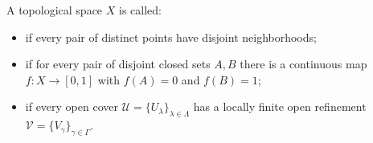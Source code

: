 A topological space $X$ is called:
\begin{itemize}
\item {} if every pair of distinct points have disjoint neighborhoods;
\item {} if for every pair of disjoint closed sets $A, B$ there is a continuous map $f: X \to [0,1]$ with $f(A) = 0$ and $f(B) = 1$;
\item {} if every open cover $\mathcal{U} = \{U_{\lambda}\}_{\lambda \in \Lambda}$ has a locally finite open refinement $\mathcal{V} = \{V_{\gamma}\}_{\gamma \in \Gamma}$.
\end{itemize}
